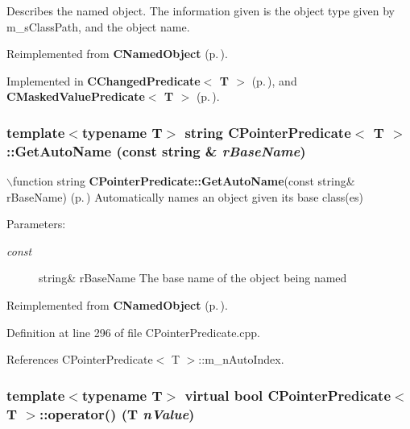 Describes the named object. The information given is the object type given by m\_\-s\-Class\-Path, and the object name. 

Reimplemented from {\bf CNamed\-Object} {\rm (p.\,\pageref{classCNamedObject_a8})}.

Implemented in {\bf CChanged\-Predicate$<$ T $>$} {\rm (p.\,\pageref{classCChangedPredicate_a7})}, and {\bf CMasked\-Value\-Predicate$<$ T $>$} {\rm (p.\,\pageref{classCMaskedValuePredicate_a8})}.
\subsubsection{\setlength{\rightskip}{0pt plus 5cm}template$<$typename T$>$ string CPointer\-Predicate$<$ T $>$::Get\-Auto\-Name (const string \& {\em r\-Base\-Name})\hspace{0.3cm}{\tt  [static, protected]}}\label{classCPointerPredicate_e0}


$\backslash$function string {\bf CPointer\-Predicate::Get\-Auto\-Name}(const string\& r\-Base\-Name) {\rm (p.\,\pageref{classCPointerPredicate_e0})} Automatically names an object given its base class(es)\begin{Desc}
\item[Parameters: ]\par
\begin{description}
\item[{\em 
const}]string\& r\-Base\-Name The base name of the object being named \end{description}
\end{Desc}


Reimplemented from {\bf CNamed\-Object} {\rm (p.\,\pageref{classCNamedObject_e0})}.

Definition at line 296 of file CPointer\-Predicate.cpp.

References CPointer\-Predicate$<$ T $>$::m\_\-n\-Auto\-Index.
\subsubsection{\setlength{\rightskip}{0pt plus 5cm}template$<$typename T$>$ virtual bool CPointer\-Predicate$<$ T $>$::operator() (T {\em n\-Value})\hspace{0.3cm}{\tt  [pure virtual]}}\label{classCPointerPredicate_a5}




